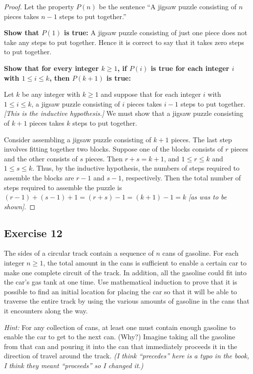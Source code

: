 \documentclass[14pt]{extarticle}
\begin{document}
\begin{proof}
    Let the property $P(n)$ be the sentence ``A jigsaw puzzle consisting of $n$ pieces takes $n - 1$ steps to put together.''

    {\bf Show that $P(1)$ is true:}
    A jigsaw puzzle consisting of just one piece does not
    take any steps to put together. Hence it is correct to say
    that it takes zero steps to put together.

        {\bf Show that for every integer $k \geq 1$, if $P(i)$ is true for each integer $i$ with $1 \leq i \leq k$, then $P(k + 1)$ is true:}

    Let $k$ be any integer with $k \geq 1$ and suppose that for
    each integer $i$ with $1 \leq i \leq k$, a jigsaw puzzle consisting of $i$ pieces takes $i - 1$ steps to put together. {\it [This is the inductive hypothesis.]}
    We must show that a jigsaw puzzle consisting of $k + 1$ pieces takes $k$ steps to put together.

    Consider assembling a jigsaw puzzle consisting of $k + 1$ pieces.
    The last step involves fitting together two blocks. Suppose one of the blocks consists of $r$ pieces and the other consists of $s$ pieces. Then $r + s = k + 1$, and $1 \leq r \leq k$ and $1 \leq s \leq k$.
    Thus, by the inductive hypothesis, the numbers of steps required to assemble the blocks are $r - 1$ and $s - 1$, respectively.
    Then the total number of steps required to assemble the puzzle is $(r - 1) + (s - 1) + 1 = (r + s) - 1 = (k + 1) - 1 = k$ {\it [as was to be shown]}.
\end{proof}

\subsection{Exercise 12}
The sides of a circular track contain a sequence of $n$ cans of gasoline. For each integer $n \geq 1$, the total amount in the cans is sufficient to enable a certain car to make one complete circuit of the track.
In addition, all the gasoline could fit into the car’s gas tank at one time.
Use mathematical induction to prove that it is possible to find an initial location for placing the car so that it will be able to traverse the entire track by using the various amounts of gasoline in the cans that it encounters along the way.

    {\it Hint:} For any collection of cans, at least one must
contain enough gasoline to enable the car to get to the
next can. (Why?)
Imagine taking all the gasoline from that can and pouring it into the can that immediately proceeds it in the direction of travel around the track.
    {\it (I think ``precedes'' here is a typo in the book, I think they meant ``proceeds'' so I changed it.)}
\end{document}
